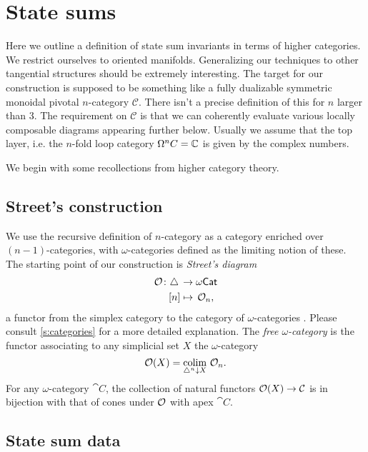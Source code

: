 
\section{State sums}

Here we outline a definition of state sum invariants in terms of higher categories.
We restrict ourselves to oriented manifolds.
Generalizing our techniques to other tangential structures should be extremely interesting.
The target for our construction is supposed to be something like a fully dualizable symmetric monoidal pivotal $n$-category $\mathcal{C}$. 
There isn't a precise definition of this for $n$ larger than 3. The requirement on $\mathcal{C}$ is that we can coherently evaluate various locally composable diagrams appearing further below. 
Usually we assume that the top layer, i.e.
the $n$-fold loop category $\Omega^nC = \mathbb{C} $ is given by the complex numbers.

We begin with some recollections from higher category theory.

\subsection{Street's construction}

We use the recursive definition of $n$-category as a category enriched over $(n-1)$-categories, with $\omega$-categories defined as the limiting notion of these.
The starting point of our construction is \textit{Street's diagram}
\[
\begin{split}
	\mathcal{O} \colon \triangle \, &\to \omega\mathsf{Cat} \\
	[n] &\mapsto \, \mathcal{O}_n,
\end{split}
\]
a functor from the simplex category to the category of $\omega$-categories \cite{street1987orientals}.
Please consult \cref{s:categories} for a more detailed explanation.
The \textit{free $\omega$-category} is the functor associating to any simplicial set $X$ the $\omega$-category
\[
\mathcal{O}(X) = \operatorname*{colim}_{\triangle^n \downarrow X} \, \mathcal{O}_n.
\]
For any $\omega$-category $\cat{C}$, the collection of natural functors $\mathcal{O}(X) \to \mathcal{C}$ is in bijection with that of cones under $\mathcal{O}$ with apex $\cat{C}$.

\subsection{State sum data}

